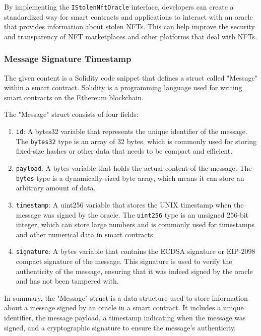 By implementing the \texttt{IStolenNftOracle} interface, developers can
create a standardized way for smart contracts and applications to
interact with an oracle that provides information about stolen NFTs.
This can help improve the security and transparency of NFT marketplaces
and other platforms that deal with NFTs.

\hypertarget{message-signature-timestamp}{%
\subsubsection{Message Signature
Timestamp}\label{message-signature-timestamp}}

The given content is a Solidity code snippet that defines a struct
called "Message" within a smart contract. Solidity is a programming
language used for writing smart contracts on the Ethereum blockchain.

The "Message" struct consists of four fields:

\begin{enumerate}
\def\labelenumi{\arabic{enumi}.}
\item
  \texttt{id}: A bytes32 variable that represents the unique identifier
  of the message. The \texttt{bytes32} type is an array of 32 bytes,
  which is commonly used for storing fixed-size hashes or other data
  that needs to be compact and efficient.
\item
  \texttt{payload}: A bytes variable that holds the actual content of
  the message. The \texttt{bytes} type is a dynamically-sized byte
  array, which means it can store an arbitrary amount of data.
\item
  \texttt{timestamp}: A uint256 variable that stores the UNIX timestamp
  when the message was signed by the oracle. The \texttt{uint256} type
  is an unsigned 256-bit integer, which can store large numbers and is
  commonly used for timestamps and other numerical data in smart
  contracts.
\item
  \texttt{signature}: A bytes variable that contains the ECDSA signature
  or EIP-2098 compact signature of the message. This signature is used
  to verify the authenticity of the message, ensuring that it was indeed
  signed by the oracle and has not been tampered with.
\end{enumerate}

In summary, the "Message" struct is a data structure used to store
information about a message signed by an oracle in a smart contract. It
includes a unique identifier, the message payload, a timestamp
indicating when the message was signed, and a cryptographic signature to
ensure the message's authenticity.

